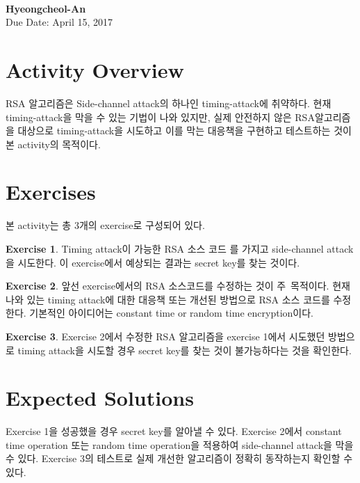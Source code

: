 \documentclass[a4paper, 11pt]{article}
\theoremstyle{definition}
\newtheorem{exercise}{Exercise}
\begin{document}
 \\
         {\phantom{} \hfill \textbf{Hyeongcheol-An}} \\
         {\phantom{} \hfill Due Date: April 15, 2017} \\

\section{Activity Overview}

RSA 알고리즘은 Side-channel attack의 하나인 timing-attack에 취약하다. 
현재 timing-attack을 막을 수 있는 기법이 나와 있지만, 
실제 안전하지 않은 RSA알고리즘을 대상으로 timing-attack을 시도하고 
이를 막는 대응책을 구현하고 테스트하는 것이 본 activity의 목적이다.

\section{Exercises}

본 activity는 총 3개의 exercise로 구성되어 있다.

\begin{exercise}

  Timing attack이 가능한 RSA 소스 코드 \cite{RSAsourcecode} 를 가지고 side-channel attack을 시도한다. 
  이 exercise에서 예상되는 결과는 secret key를 찾는 것이다.

\end{exercise}

\begin{exercise}

  앞선 exercise에서의 RSA 소스코드를 수정하는 것이 주 목적이다.
  현재 나와 있는 timing attack에 대한 대응책 또는 개선된 방법으로 RSA 소스 코드를 수정한다. 
  기본적인 아이디어는 constant time or random time encryption이다.

\end{exercise}

\begin{exercise}

  Exercise 2에서 수정한 RSA 알고리즘을 exercise 1에서 시도했던 방법으로 timing attack을 시도할 경우
  secret key를 찾는 것이 불가능하다는 것을 확인한다.

\end{exercise}

\section{Expected Solutions}

Exercise 1을 성공했을 경우 secret key를 알아낼 수 있다. 
Exercise 2에서 constant time operation 또는 random time operation을 적용하여 side-channel attack을 막을 수 있다. 
Exercise 3의 테스트로 실제 개선한 알고리즘이 정확히 동작하는지 확인할 수 있다.





\end{document}
